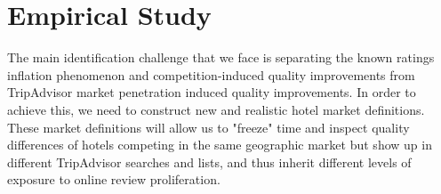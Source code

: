 \documentclass[12pt, leqno]{article}
\begin{document}

\section*{Empirical Study}\label{sec:maineffect} 

The main identification challenge that we face is separating the known ratings inflation phenomenon and competition-induced quality improvements from TripAdvisor market penetration induced quality improvements. In order to achieve this, we need to construct new and realistic hotel market definitions. These market definitions will allow us to "freeze" time and inspect quality differences of hotels competing in the same geographic market but show up in different TripAdvisor searches and lists, and thus inherit different levels of exposure to online review proliferation.


\end{document}
